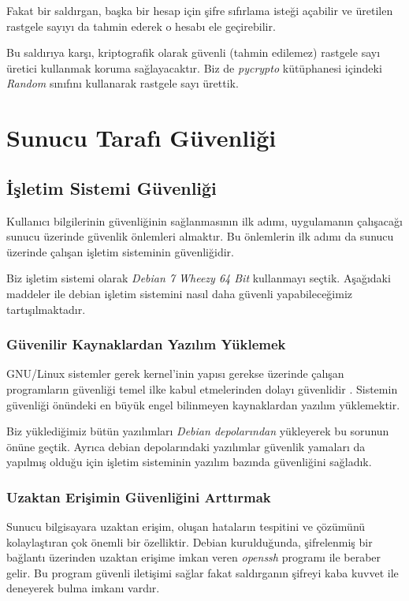 \documentclass[11pt,a4paper]{report}
\begin{document}
Fakat bir saldırgan, başka bir hesap için şifre sıfırlama isteği açabilir ve üretilen rastgele sayıyı da tahmin ederek o hesabı ele geçirebilir.

Bu saldırıya karşı, kriptografik olarak güvenli (tahmin edilemez) rastgele sayı üretici kullanmak koruma sağlayacaktır. Biz de \emph{pycrypto} kütüphanesi içindeki \emph{Random} sınıfını kullanarak rastgele sayı ürettik.

\chapter{Sunucu Tarafı Güvenliği}

\section{İşletim Sistemi Güvenliği}

Kullanıcı bilgilerinin güvenliğinin sağlanmasının ilk adımı, uygulamanın çalışacağı sunucu üzerinde güvenlik önlemleri almaktır. Bu önlemlerin ilk adımı da sunucu üzerinde çalışan işletim sisteminin güvenliğidir.

Biz işletim sistemi olarak \emph{Debian 7 Wheezy 64 Bit} kullanmayı seçtik. Aşağıdaki maddeler ile debian işletim sistemini nasıl daha güvenli yapabileceğimiz tartışılmaktadır.

\subsection{Güvenilir Kaynaklardan Yazılım Yüklemek}

GNU/Linux sistemler gerek kernel'inin yapısı gerekse üzerinde çalışan programların güvenliği temel ilke kabul etmelerinden dolayı güvenlidir \cite{linuxsec}. Sistemin güvenliği önündeki en büyük engel bilinmeyen kaynaklardan yazılım yüklemektir.

Biz yüklediğimiz bütün yazılımları \emph{Debian depolarından} yükleyerek bu sorunun önüne geçtik. Ayrıca debian depolarındaki yazılımlar güvenlik yamaları da yapılmış olduğu için işletim sisteminin yazılım bazında güvenliğini sağladık.

\subsection{Uzaktan Erişimin Güvenliğini Arttırmak}

Sunucu bilgisayara uzaktan erişim, oluşan hataların tespitini ve çözümünü kolaylaştıran çok önemli bir özelliktir. Debian kurulduğunda, şifrelenmiş bir bağlantı üzerinden uzaktan erişime imkan veren \emph{openssh} programı ile beraber gelir. Bu program güvenli iletişimi sağlar fakat saldırganın şifreyi kaba kuvvet ile deneyerek bulma imkanı vardır.
\end{document}
